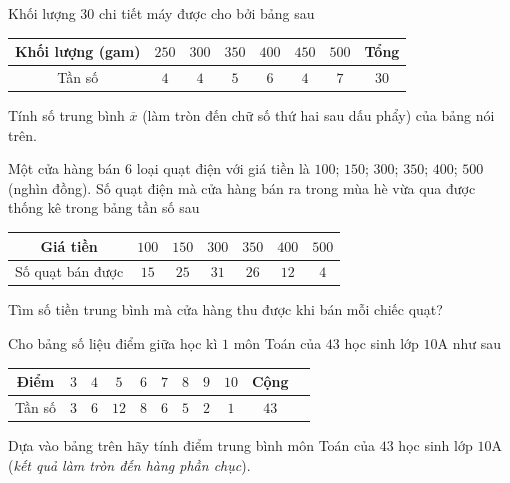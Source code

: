 \begin{ex}%
	Khối  lượng $30$ chi tiết máy được cho bởi bảng sau
	\begin{center}
		\begin{tabular}{|c|c|c|c|c|c|c|c|}
			 \hline
			Khối lượng (gam)& $250$ & $300$ & $350$  & $400$ & $450$ & $500$ & Tổng \\
			\hline 
			Tần số& $4$ & $4$  & $5$ & $6$ & $4$ & $7$ & $30$ \\
			 \hline
		\end{tabular}
	\end{center}
	Tính số trung bình $\overline{x}$ (làm tròn đến chữ số thứ hai sau dấu phẩy) của bảng nói trên. 
\end{ex}

\begin{bt}%
	Một cửa hàng bán $6$ loại quạt điện với giá tiền là $100$; $150$; $300$; $350$; $400$; $500$ (nghìn đồng). Số quạt điện mà cửa  hàng bán ra trong mùa hè vừa qua được thống kê trong bảng tần số sau
	\begin{center}
		\begin{tabular}{|c|c|c|c|c|c|c|}
			\hline 
			Giá tiền & $100$ & $150$ & $300$ & $350$ & $400$ &  $500$\\
			\hline 
			Số quạt bán được & $15$ &  $25$ & $31$ & $26$ & $12$ & $4$\\
			 \hline
		\end{tabular}
	\end{center}
	Tìm số tiền trung bình mà cửa hàng thu  được khi bán mỗi chiếc quạt?
\end{bt}

\begin{bt}%
	Cho bảng số liệu điểm  giữa học kì $1$ môn Toán của $43$ học sinh lớp $10$A như sau
	\begin{center}
		\renewcommand{\arraystretch}{1.4} 
		\begin{tabular}{|c|c|c|c|c|c|c|c|c|c|c|}
			 \hline
			Điểm & $3$ & $4$ & $5$ & $6$ & $7$ & $8$ &  $9$ & $10$& Cộng\\
			\hline 
			Tần số & $3$ & $6$ & $12$ & $8$ & $6$ & $5$ &  $2$ & $1$ & $43$\\
			\hline 
		\end{tabular}
	\end{center}
	Dựa vào bảng trên hãy tính điểm trung bình môn Toán của $43$ học sinh lớp $10$A (\textit{kết  quả làm tròn đến hàng phần chục}).
\end{bt}

